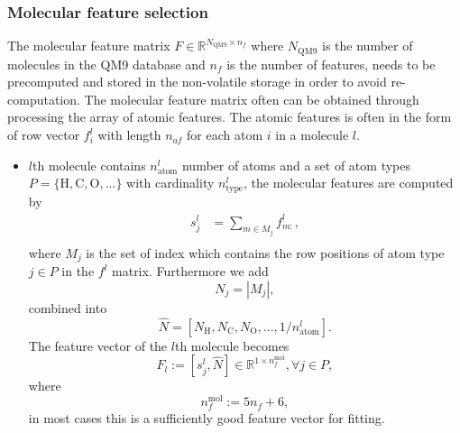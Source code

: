 \documentclass[12pt]{article}
\begin{document}
\subsubsection{Molecular feature selection}
The molecular feature matrix $F \in \mathbb{R}^{N_\text{QM9} \times n_f}$ where $N_\text{QM9}$ is the number of molecules in the QM9 database and $n_f$ is the number of features, needs to be precomputed and stored in the non-volatile storage in order to avoid re-computation.
The molecular feature matrix often can be obtained through processing the array of atomic features.
The atomic features is often in the form of row vector $f^l_{i}$ with length $n_{af}$ for each atom $i$ in a molecule $l$.
\begin{itemize}
    \item $l$th molecule contains $n^l_\text{atom}$ number of atoms and a set of atom types $P = \{\text{H}, \text{C}, \text{O}, ...\}$ with cardinality $n^l_\text{type}$,
	the molecular features are computed by
        \begin{equation}
			\label{eq:atom_to_mol_feature}
            \begin{split}
                s^l_{j} &= \sum_{m \in M_j} f^l_{m:}, \\
            \end{split}
        \end{equation}
		where $M_j$ is the set of index which contains the row positions of atom type $j \in P$ in the $f^l$ matrix. 
		Furthermore we add
		\begin{equation}
			N_j = |M_j|,
		\end{equation}
		combined into
		\begin{equation}
			\hat{N} = [N_\text{H}, N_\text{C}, N_\text{O},..., 1/n^l_\text{atom}].
		\end{equation}
		The feature vector of the $l$th molecule becomes
		\begin{equation}
			F_l := [s^l_{j}, \hat{N} ] \in \mathbb{R}^{1 \times n_f^\text{mol}}, \forall j \in P,
        \end{equation}
		where
		\begin{equation}
    		n_f^\text{mol} := 5n_f + 6,
    	\end{equation}
		in most cases this is a sufficiently good feature vector for fitting.
		

\end{itemize}
\end{document}
